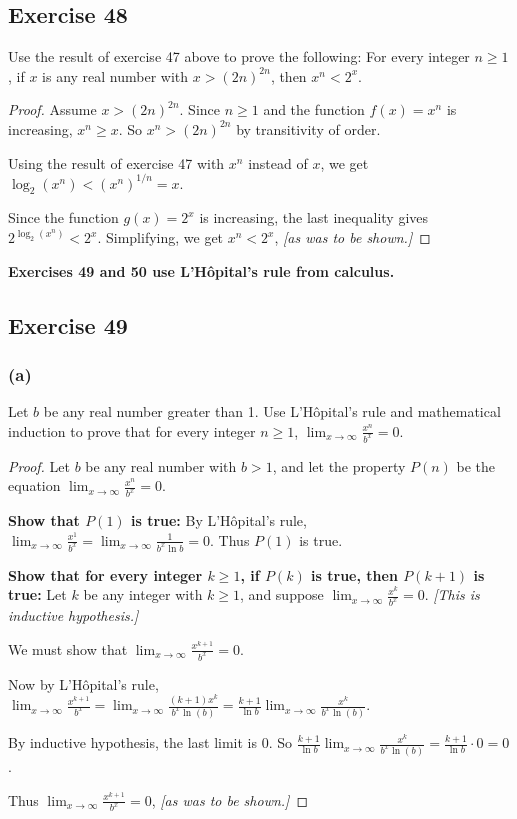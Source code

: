 \documentclass[14pt]{extarticle}
\newcommand{\dps}{\displaystyle}
\newcommand{\cy}{\color{cyan}}
\begin{document}
\subsection{Exercise 48}
Use the result of exercise 47 above to prove the following: For every integer \(n \geq 1\), if \(x\) is any real number 
with \(x > (2n)^{2n}\), then \(x^n < 2^x\).

\begin{proof}
Assume \(x > (2n)^{2n}\). Since \(n \geq 1\) and the function \(f(x) = x^n\) is increasing, \(x^n \geq x\). So 
\(x^n > (2n)^{2n}\) by transitivity of order. 

Using the result of exercise 47 with \(x^n\) instead of \(x\), we get \(\log_2(x^n) < (x^n)^{1/n} = x\). 

Since the function \(g(x) = 2^x\) is increasing, the last inequality gives \(2^{\log_2(x^n)} < 2^x\). Simplifying, we 
get \(x^n < 2^x\), {\it [as was to be shown.]}
\end{proof}

{\bf \cy Exercises 49 and 50 use L’Hôpital’s rule from calculus.}

\subsection{Exercise 49}
\subsubsection{(a)}
Let \(b\) be any real number greater than 1. Use L’Hôpital’s rule and mathematical induction to prove that for every integer \(n \geq 1\), \(\dps \lim_{x \to \infty}\frac{x^n}{b^x} = 0\).

\begin{proof}
Let \(b\) be any real number with \(b > 1\), and let the property \(P(n)\) be the equation \(\dps \lim_{x \to \infty}
\frac{x^n}{b^x} = 0\).

{\bf Show that \(P(1)\) is true:} By L’Hôpital’s rule, \(\dps \lim_{x \to \infty} \frac{x^1}{b^x} = \lim_{x \to \infty} 
\frac{1}{b^x \ln b} = 0\). Thus \(P(1)\) is true.

{\bf Show that for every integer \(k \geq 1\), if \(P(k)\) is true, then \(P(k + 1)\) is true:} Let \(k\) be any integer 
with \(k \geq 1\), and suppose \(\dps \lim_{x \to \infty}
\frac{x^k}{b^x} = 0\). {\it [This is inductive hypothesis.]} 

We must show that \(\dps \lim_{x \to \infty}\frac{x^{k+1}}{b^x} = 0\).

Now by L’Hôpital’s rule, \(\dps \lim_{x \to \infty}\frac{x^{k+1}}{b^x} = \lim_{x \to \infty}\frac{(k+1)x^k}{b^x 
\ln(b)} = \frac{k+1}{\ln b}\lim_{x \to \infty}\frac{x^k}{b^x \ln(b)}\).

By inductive hypothesis, the last limit is 0. So \(\dps \frac{k+1}{\ln b}\lim_{x \to \infty}\frac{x^k}{b^x \ln(b)} = 
\frac{k+1}{\ln b} \cdot 0 = 0\).

Thus \(\dps \lim_{x \to \infty}\frac{x^{k+1}}{b^x} = 0\), {\it [as was to be shown.]}
\end{proof}
\end{document}
